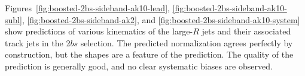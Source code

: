 Figures~\ref{fig:boosted-2bs-sideband-ak10-lead}, \ref{fig:boosted-2bs-sideband-ak10-subl}, \ref{fig:boosted-2bs-sideband-ak2},  and \ref{fig:boosted-2bs-sideband-ak10-system} show predictions of various kinematics of the large-$R$ jets and their associated track jets in the 2$bs$ selection. The predicted normalization agrees perfectly by construction, but the shapes are a feature of the prediction. The quality of the prediction is generally good, and no clear systematic biases are observed.


